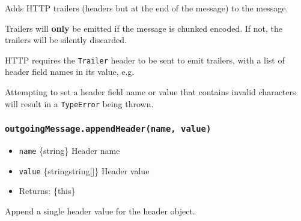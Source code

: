 Adds HTTP trailers (headers but at the end of the message) to the
message.

Trailers will \textbf{only} be emitted if the message is chunked
encoded. If not, the trailers will be silently discarded.

HTTP requires the \texttt{Trailer} header to be sent to emit trailers,
with a list of header field names in its value, e.g.

\begin{Shaded}
\begin{Highlighting}[]
\NormalTok{(}\OperatorTok{,}\NormalTok{ \{ }\OperatorTok{:} \OperatorTok{,}
                         \OperatorTok{:} \NormalTok{ \})}\OperatorTok{;}
\OperatorTok{;}
\NormalTok{(\{ }\OperatorTok{:} \NormalTok{ \})}\OperatorTok{;}
\NormalTok{()}\OperatorTok{;}
\end{Highlighting}
\end{Shaded}

Attempting to set a header field name or value that contains invalid
characters will result in a \texttt{TypeError} being thrown.

\subsubsection{\texorpdfstring{\texttt{outgoingMessage.appendHeader(name,\ value)}}{outgoingMessage.appendHeader(name, value)}}\label{outgoingmessage.appendheadername-value}

\begin{itemize}
\tightlist
\item
  \texttt{name} \{string\} Header name
\item
  \texttt{value} \{string\textbar string{[}{]}\} Header value
\item
  Returns: \{this\}
\end{itemize}

Append a single header value for the header object.

